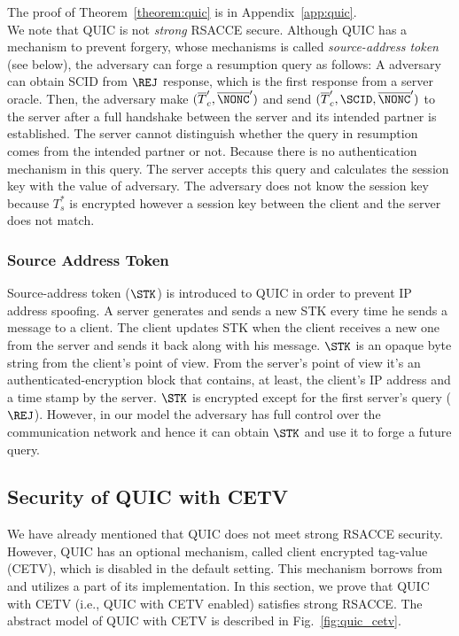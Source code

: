 The proof of Theorem~\ref{theorem:quic} is in Appendix~\ref{app:quic}.\\

We note that QUIC is not \textit{strong} RSACCE secure. Although QUIC has a mechanism to prevent forgery, whose mechanisms is called \textit{source-address token} (see below), the adversary can forge a resumption query as follows: A adversary can obtain SCID from $\REJ$ response, which is the first response from a server oracle. Then, the adversary make $(\overline{T}_c^{\prime}, \overline{\NONC}^{\prime})$ and send $(\overline{T}_c^{\prime}, \SCID, \overline{\NONC}^{\prime})$ to the server after a full handshake between the server and its intended partner is established. The server cannot distinguish whether the query in resumption comes from the intended partner or not. Because there is no authentication mechanism in this query. The server accepts this query and calculates the session key with the value of adversary. The adversary does not know the session key because $T_s^{\ast}$ is encrypted however a session key between the client and the server does not match.

\subsubsection{Source Address Token} \label{sec:source_address_token}
Source-address token ($\STK$) is introduced to QUIC in order to prevent IP address spoofing. A server generates and sends a new STK every time he sends a message to a client. The client updates STK when the client receives a new one from the server and sends it back along with his message. $\STK$ is an opaque byte string from the client's point of view. From the server's point of view it's an authenticated-encryption block that contains, at least, the client's IP address and a time stamp by the server. $\STK$ is encrypted except for the first server's query ($\REJ$). However, in our model the adversary has full control over the communication network and hence it can obtain $\STK$ and use it to forge a future query.

\subsection{Security of QUIC with CETV} \label{sec:quic_cetv}

We have already mentioned that QUIC does not meet strong RSACCE security. However, QUIC has an optional mechanism, called client encrypted tag-value (CETV), which is disabled in the default setting. This mechanism borrows from~\cite{MCBW12:TLS-OCB,ChannelID} and utilizes a part of its implementation. In this section, we prove that QUIC with CETV (i.e., QUIC with CETV enabled) satisfies strong RSACCE.
The abstract model of QUIC with CETV is described in Fig.~\ref{fig:quic_cetv}.

